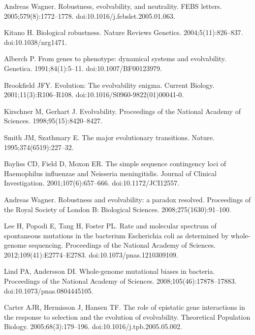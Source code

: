 \documentclass[10pt,letterpaper,final]{article}
\begin{document}
\begin{thebibliography}{10}
{Andreas Wagner}.
\newblock Robustness, evolvability, and neutrality.
\newblock FEBS letters. 2005;579(8):1772--1778.
\newblock doi:{10.1016/j.febslet.2005.01.063}.

Kitano H.
\newblock Biological robustness.
\newblock Nature Reviews Genetics. 2004;5(11):826--837.
\newblock doi:{10.1038/nrg1471}.

Alberch P.
\newblock From genes to phenotype: dynamical systems and evolvability.
\newblock Genetica. 1991;84(1):5--11.
\newblock doi:{10.1007/BF00123979}.

Brookfield JFY.
\newblock Evolution: {The} evolvability enigma.
\newblock Current Biology. 2001;11(3):R106--R108.
\newblock doi:{10.1016/S0960-9822(01)00041-0}.

Kirschner M, Gerhart J.
\newblock Evolvability.
\newblock Proceedings of the National Academy of Sciences.
  1998;95(15):8420--8427.

Smith JM, Szathmary E.
\newblock The major evolutionary transitions.
\newblock Nature. 1995;374(6519):227--32.

Bayliss CD, Field D, Moxon ER.
\newblock The simple sequence contingency loci of {Haemophilus} influenzae and
  {Neisseria} meningitidis.
\newblock Journal of Clinical Investigation. 2001;107(6):657--666.
\newblock doi:{10.1172/JCI12557}.

{Andreas Wagner}.
\newblock Robustness and evolvability: a paradox resolved.
\newblock Proceedings of the Royal Society of London B: Biological Sciences.
  2008;275(1630):91--100.

Lee H, Popodi E, Tang H, Foster PL.
\newblock Rate and molecular spectrum of spontaneous mutations in the bacterium
  {Escherichia} coli as determined by whole-genome sequencing.
\newblock Proceedings of the National Academy of Sciences.
  2012;109(41):E2774--E2783.
\newblock doi:{10.1073/pnas.1210309109}.

Lind PA, Andersson DI.
\newblock Whole-genome mutational biases in bacteria.
\newblock Proceedings of the National Academy of Sciences.
  2008;105(46):17878--17883.
\newblock doi:{10.1073/pnas.0804445105}.

Carter AJR, Hermisson J, Hansen TF.
\newblock The role of epistatic gene interactions in the response to selection
  and the evolution of evolvability.
\newblock Theoretical Population Biology. 2005;68(3):179--196.
\newblock doi:{10.1016/j.tpb.2005.05.002}.


\end{thebibliography}
\end{document}
